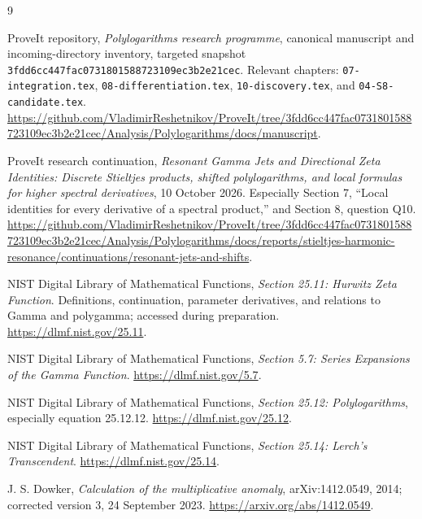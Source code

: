 \documentclass[11pt]{article}
\numberwithin{equation}{section}
\theoremstyle{definition}\newtheorem{definition}[theorem]{Definition}
\theoremstyle{remark}\newtheorem{remark}[theorem]{Remark}\newtheorem{example}[theorem]{Example}
\newcommand{\pin}{\texttt{3fdd6cc447fac0731801588723109ec3b2e21cec}}
\begin{document}

\clearpage

\begin{thebibliography}{9}
\raggedright
{}
ProveIt repository, \emph{Polylogarithms research programme},
canonical manuscript and incoming-directory inventory, targeted snapshot
\pin. Relevant chapters: \texttt{07-integration.tex},
\texttt{08-differentiation.tex}, \texttt{10-discovery.tex}, and
\texttt{04-S8-candidate.tex}.
\url{https://github.com/VladimirReshetnikov/ProveIt/tree/3fdd6cc447fac0731801588723109ec3b2e21cec/Analysis/Polylogarithms/docs/manuscript}.

ProveIt research continuation, \emph{Resonant Gamma Jets and Directional
Zeta Identities: Discrete Stieltjes products, shifted polylogarithms, and
local formulas for higher spectral derivatives}, 10 October 2026.
Especially Section 7, ``Local identities for every derivative of a
spectral product,'' and Section 8, question Q10.
\url{https://github.com/VladimirReshetnikov/ProveIt/tree/3fdd6cc447fac0731801588723109ec3b2e21cec/Analysis/Polylogarithms/docs/reports/stieltjes-harmonic-resonance/continuations/resonant-jets-and-shifts}.

NIST Digital Library of Mathematical Functions,
\emph{Section 25.11: Hurwitz Zeta Function}.
Definitions, continuation, parameter derivatives, and relations to Gamma
and polygamma; accessed during preparation.
\url{https://dlmf.nist.gov/25.11}.

NIST Digital Library of Mathematical Functions,
\emph{Section 5.7: Series Expansions of the Gamma Function}.
\url{https://dlmf.nist.gov/5.7}.

NIST Digital Library of Mathematical Functions,
\emph{Section 25.12: Polylogarithms}, especially equation 25.12.12.
\url{https://dlmf.nist.gov/25.12}.

NIST Digital Library of Mathematical Functions,
\emph{Section 25.14: Lerch's Transcendent}.
\url{https://dlmf.nist.gov/25.14}.

J. S. Dowker, \emph{Calculation of the multiplicative anomaly},
arXiv:1412.0549, 2014; corrected version 3, 24 September 2023.
\url{https://arxiv.org/abs/1412.0549}.
\end{thebibliography}

\end{document}
